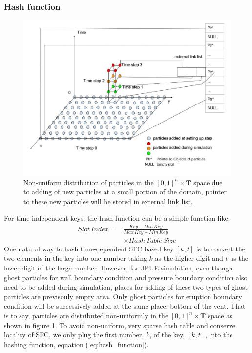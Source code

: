 \documentclass[conference,compsoc]{IEEEtran}
\begin{document}
\subsubsection{Hash function}
\begin{figure}[!t]
\centering
\includegraphics[scale=0.255]{Particle_adding_with_link}
\caption{Non-uniform distribution of particles in the $[0,1]^n \times \textbf{T}$ space due to adding of new particles at a small portion of the domain, pointer to these new particles will be stored in external link list.}
\label{fig:Particle_adding_with_link}
\end{figure}
For time-independent keys, the hash function can be a simple function like:
\begin{equation}
\label{eq:hash_function}
\begin{split}
Slot\,Index= &\frac{Key - Min\,Key}{Max\,Key - Min\,Key} \\
& \times Hash\,Table\,Size 
\end{split}
\end{equation}
One natural way to hash time-dependent SFC based key $[k,t]$ is to convert the two elements in the key into one number taking $k$ as the higher digit and $t$ as the lower digit of the large number. However, for JPUE simulation, even though ghost particles for wall boundary condition and pressure boundary condition also need to be added during simulation, places for adding of these two types of ghost particles are previsouly empty area. Only ghost particles for eruption boundary condition will be successively added at the same place: bottom of the vent. That is to say, particles are distributed non-uniformly in the $[0,1]^n \times \textbf{T}$ space as shown in figure \ref{fig:Particle_adding_with_link}. To avoid non-uniform, very sparse hash table and conserve locality of SFC, we only plug the first number, $k$, of the key, $[k,t]$, into the hashing function, equation (\ref{eq:hash_function}). 
\end{document}
